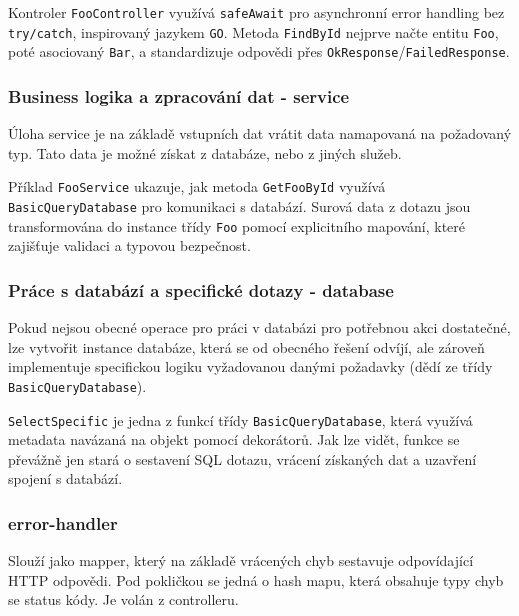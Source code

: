 

Kontroler \texttt{FooController} využívá \texttt{safeAwait} pro asynchronní error handling bez \texttt{try/catch}, inspirovaný jazykem \texttt{GO}. Metoda \texttt{FindById} nejprve načte entitu \texttt{Foo}, poté asociovaný \texttt{Bar}, a standardizuje odpovědi přes \texttt{OkResponse}/\texttt{FailedResponse}.

\subsubsection{Business logika a zpracování dat - service}
Úloha service je na základě vstupních dat vrátit data namapovaná na požadovaný typ. Tato data je možné získat z databáze, nebo z jiných služeb.



Příklad \texttt{FooService} ukazuje, jak metoda \texttt{GetFooById} využívá \texttt{BasicQueryDatabase} pro komunikaci s databází. Surová data z dotazu jsou transformována do instance třídy \texttt{Foo} pomocí explicitního mapování, které zajišťuje validaci a typovou bezpečnost.

\subsubsection{Práce s databází a specifické dotazy - database}
Pokud nejsou obecné operace pro práci v databázi pro potřebnou akci dostatečné, lze vytvořit instance databáze, která se od obecného řešení odvíjí, ale zároveň implementuje specifickou logiku vyžadovanou danými požadavky (dědí ze třídy \texttt{BasicQueryDatabase}).



\texttt{SelectSpecific} je jedna z funkcí třídy \texttt{BasicQueryDatabase}, která využívá metadata navázaná na objekt pomocí dekorátorů. Jak lze vidět, funkce se převážně jen stará o sestavení SQL dotazu, vrácení získaných dat a uzavření spojení s databází.

\subsubsection{error-handler}
Slouží jako mapper, který na základě vrácených chyb sestavuje odpovídající HTTP odpovědi. Pod pokličkou se jedná o hash mapu, která obsahuje typy chyb se status kódy. Je volán z controlleru.

